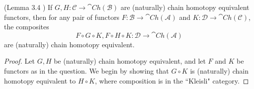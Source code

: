 \begin{lem}[label=lem:3.4]{(Lemma 3.4 \cite{BJORT})}
    If $G,H:\mathcal{C}\rightarrow \cat{Ch}(\mathcal{B})$ are (naturally) chain homotopy equivalent functors, then for any pair of functors $F:\mathcal{B}\rightarrow \cat{Ch}(\mathcal{A})$ and $K:\mathcal{D}\rightarrow \cat{Ch}(\mathcal{C})$, the composites
    \begin{equation*}
        F\circ G\circ K,F\circ H\circ K:\mathcal{D}\rightarrow \cat{Ch}(\mathcal{A})
    \end{equation*}
    are (naturally) chain homotopy equivalent.
\end{lem}
\begin{proof}
    Let $G,H$ be (naturally) chain homotopy equivalent, and let $F$ and $K$ be functors as in the question. We begin by showing that $G\circ K$ is (naturally) chain homotopy equivalent to $H\circ K$, where composition is in the ``Kleisli" category. 

    \vspace{10pt}




\end{proof}
